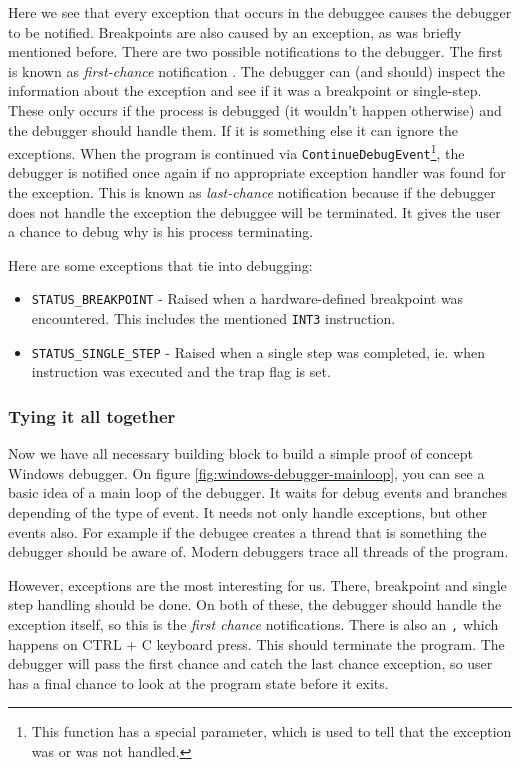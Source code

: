 Here we see that every exception that occurs in the debuggee causes the
debugger to be notified. Breakpoints are also caused by an exception, as was
briefly mentioned before. There are two possible notifications to the debugger.
The first is known as \textit{first-chance} notification
\cite{windows-msdn-dbg-exc-handling}. The debugger can (and should) inspect the
information about the exception and see if it was a breakpoint or single-step.
These only occurs if the process is debugged (it wouldn't happen otherwise) and
the debugger should handle them. If it is something else it can ignore the
exceptions. When the program is continued via
\texttt{ContinueDebugEvent}\footnote{This function has a special
parameter, which is used to tell that the exception was or was not handled.},
the debugger is notified once again if no appropriate exception handler was
found for the exception. This is known as \textit{last-chance} notification
because if the debugger does not handle the exception the debuggee will be
terminated. It gives the user a chance to debug why is his process terminating.

Here are some exceptions that tie into debugging:
\begin{itemize}
    \item \texttt{STATUS_BREAKPOINT} - Raised when a hardware-defined breakpoint was encountered. This includes the mentioned \texttt{INT3} instruction.
    \item \texttt{STATUS_SINGLE_STEP} - Raised when a single step was completed, ie. when instruction was executed and the trap flag is set.
\end{itemize}

\subsubsection*{Tying it all together}
Now we have all necessary building block to build a simple proof of concept
Windows debugger. On figure \ref{fig:windows-debugger-mainloop}, you can see a
basic idea of a main loop of the debugger. It waits for debug events and
branches depending of the type of event. It needs not only handle exceptions,
but other events also. For example if the debugee creates a thread that is
something the debugger should be aware of. Modern debuggers trace all threads
of the program.

 However,
exceptions are the most interesting for us. There, breakpoint and single step
handling should be done. On both of these, the debugger should handle the
exception itself, so this is the \textit{first chance} notifications. There is
also an \texttt, which happens on CTRL + C keyboard press.
This should terminate the program. The debugger will pass the first chance and
catch the last chance exception, so user has a final chance to look at the
program state before it exits.

